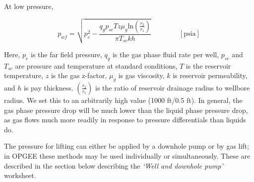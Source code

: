 \documentclass[11pt]{report}
\newcommand{\sheet}[1]{\textit{`{#1}'}}
\newcommand{\eqnunit}[1]{\quad\quad \scriptstyle{\left[\text{#1}\right]}}
\begin{document}
At low pressure,

\begin{equation} 
p_{wf} = \sqrt{p_e^2 - \frac{q_g p_{sc} T z \mu_g \text{ln}\left(\frac{r_2}{r_1} \right)}{\pi T_{sc} k h}} \quad\quad\eqnunit{psia}
\end{equation}

Here, $p_e$ is the far field pressure, $q_g$ is the gas phase fluid rate per well, $p_{sc}$ and $T_{sc}$ are pressure and temperature at standard conditions, $T$ is the reservoir temperature, $z$ is the gas z-factor, $\mu_g$ is gas viscosity, $k$ is reservoir permeability, and $h$ is pay thickness. $\left(\frac{r_2}{r_1} \right)$ is the ratio of reservoir drainage radius to wellbore radius. We set this to an arbitrarily high value (1000 ft/0.5 ft). In general, the gas phase pressure drop will be much lower than the liquid phase pressure drop, as gas flows much more readily in response to pressure differentials than liquids do.

The pressure for lifting can either be applied by a downhole pump or by gas lift; in OPGEE these methods may be used individually or simultaneously. These are described in the section below describing the \sheet{Well and downhole pump} worksheet.

\clearpage
\end{document}
